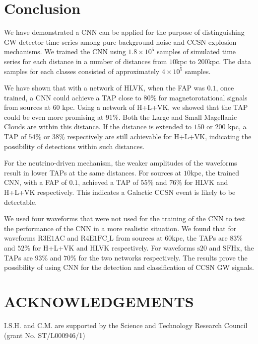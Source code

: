 \documentclass[aps,twocolumn,showpacs,groupedaddress, nofootinbib]{revtex4}  %
\begin{document}
\section{Conclusion}\label{sec:conclusion}
We have demonstrated a \ac{CNN} can be applied for the purpose of distinguishing \ac{GW} detector time series 
among pure background noise and \ac{CCSN} explosion mechanisms. 
We trained the \ac{CNN} using $1.8\times10^{5}$ samples of simulated time series for each distance in a number of distances from $10$kpc to $200$kpc.
The data samples for each classes consisted of approximately $4\times10^5$ samples. 

We have shown that with a network of HLVK, when the \ac{FAP} was $0.1$, once trained, a \ac{CNN} could achieve a \ac{TAP} close to $80\%$
for magnetorotational signals from sources at $60$ kpc. 
Using a network of H+L+VK, we showed that the \ac{TAP} could be even more promising at $91\%$. Both the Large and Small Magellanic Clouds are within this distance.
If the distance is extended to $150$ or $200$ kpc, a \ac{TAP} of $54\%$ or $38\%$ 
respectively are still achievable for H+L+VK, indicating the possibility of detections within such distances. 

For the neutrino-driven mechanism, the weaker amplitudes of the waveforms result in lower \acp{TAP} at the same distances.
For sources at $10$kpc, the trained \ac{CNN}, with a \ac{FAP} of $0.1$, achieved a \ac{TAP} of $55\%$ and $76\%$ for HLVK and H+L+VK respectively.
This indicates a Galactic \ac{CCSN} event is likely to be detectable.

We used four waveforms that were not used for the training of the \ac{CNN} to test the performance of the \ac{CNN} in a more realistic situation.
We found that for waveforms $\text{R3E1AC}$ and $\text{R4E1FC\_L}$ from sources at $60$kpc, the \acp{TAP} are $83\%$ and $52\%$ for H+L+VK and HLVK respectively.
For waveforms $\text{s}20$ and $\text{SFHx}$, the \acp{TAP} are $93\%$ and $70\%$ for the two networks respectively.
The results prove the possibility of using \ac{CNN} for the detection and classification of \ac{CCSN} \ac{GW} signals.
\\
\section*{ACKNOWLEDGEMENTS}
I.S.H. and C.M. are supported by
the Science and Technology Research Council (grant No.
ST/L000946/1)



\end{document}
